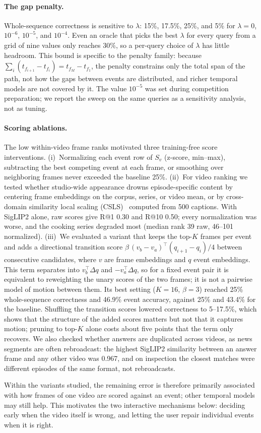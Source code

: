 \paragraph{The gap penalty.}
Whole-sequence correctness is sensitive to $\lambda$: 15\%, 17.5\%, 25\%, and 5\% for $\lambda=0$, $10^{-6}$, $10^{-5}$, and $10^{-4}$.
Even an oracle that picks the best $\lambda$ for every query from a grid of nine values only reaches 30\%, so a per-query choice of $\lambda$ has little headroom.
This bound is specific to the penalty family: because $\sum_i (t_{f_{i+1}}-t_{f_i}) = t_{f_M}-t_{f_1}$, the penalty constrains only the total span of the path, not how the gaps between events are distributed, and richer temporal models are not covered by it.
The value $10^{-5}$ was set during competition preparation; we report the sweep on the same queries as a sensitivity analysis, not as tuning.

\paragraph{Scoring ablations.}
The low within-video frame ranks motivated three training-free score interventions.
(i)~Normalizing each event row of $S_v$ (z-score, min--max), subtracting the best competing event at each frame, or smoothing over neighboring frames never exceeded the baseline 25\%.
(ii)~For video ranking we tested whether studio-wide appearance drowns episode-specific content by centering frame embeddings on the corpus, series, or video mean, or by cross-domain similarity local scaling (CSLS)~\cite{conneau2018wordtranslation} computed from 500 captions.
With SigLIP2 alone, raw scores give R@1 0.30 and R@10 0.50; every normalization was worse, and the cooking series degraded most (median rank 39 raw, 46--101 normalized).
(iii)~We evaluated a variant that keeps the top-$K$ frames per event and adds a directional transition score $\beta\,(v_b-v_a)^\top(q_{i+1}-q_i)/4$ between consecutive candidates, where $v$ are frame embeddings and $q$ event embeddings.
This term separates into $v_b^\top\Delta q$ and $-v_a^\top\Delta q$, so for a fixed event pair it is equivalent to reweighting the unary scores of the two frames; it is not a pairwise model of motion between them.
Its best setting ($K=16$, $\beta=3$) reached 25\% whole-sequence correctness and 46.9\% event accuracy, against 25\% and 43.4\% for the baseline.
Shuffling the transition scores lowered correctness to 5--17.5\%, which shows that the structure of the added scores matters but not that it captures motion; pruning to top-$K$ alone costs about five points that the term only recovers.
We also checked whether answers are duplicated across videos, as news segments are often rebroadcast: the highest SigLIP2 similarity between an answer frame and any other video was 0.967, and on inspection the closest matches were different episodes of the same format, not rebroadcasts.

Within the variants studied, the remaining error is therefore primarily associated with how frames of one video are scored against an event; other temporal models may still help. This motivates the two interactive mechanisms below: deciding early when the video itself is wrong, and letting the user repair individual events when it is right.
